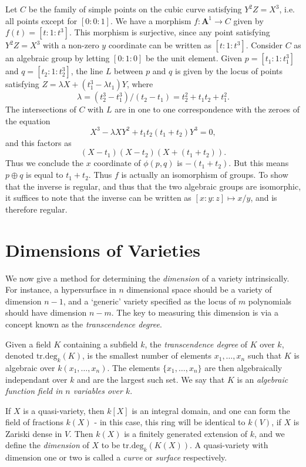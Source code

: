 \begin{example}
    Let $C$ be the family of simple points on the cubic curve satisfying $Y^2Z = X^3$, i.e. all points except for $[0:0:1]$. We have a morphism $f: \mathbf{A}^1 \to C$ given by $f(t) = [t:1:t^3]$. This morphism is surjective, since any point satisfying $Y^2Z = X^3$ with a non-zero $y$ coordinate can be written as $[t:1:t^3]$. Consider $C$ as an algebraic group by letting $[0:1:0]$ be the unit element. Given $p = [t_1:1:t_1^3]$ and $q = [t_2:1:t_2^3]$, the line $L$ between $p$ and $q$ is given by the locus of points satisfying $Z = \lambda X + (t_1^3 - \lambda t_1) Y$, where
    \[ \lambda = (t_2^3 - t_1^3)/(t_2 - t_1) = t_2^2 + t_1t_2 + t_1^2. \]
    The intersections of $C$ with $L$ are in one to one correspondence with the zeroes of the equation
    \[ X^3 - \lambda XY^2 + t_1 t_2 (t_1 + t_2) Y^3 = 0, \]
    and this factors as
    \[ (X - t_1)(X - t_2)(X + (t_1 + t_2)). \]
    Thus we conclude the $x$ coordinate of $\phi(p,q)$ is $-(t_1 + t_2)$. But this means $p \oplus q$ is equal to $t_1 + t_2$. Thus $f$ is actually an isomorphism of groups. To show that the inverse is regular, and thus that the two algebraic groups are isomorphic, it suffices to note that the inverse can be written as $[x:y:z] \mapsto x/y$, and is therefore regular.
\end{example}

\section{Dimensions of Varieties}

We now give a method for determining the \emph{dimension} of a variety intrinsically. For instance, a hypersurface in $n$ dimensional space should be a variety of dimension $n-1$, and a `generic' variety specified as the locus of $m$ polynomials should have dimension $n-m$. The key to measuring this dimension is via a concept known as the \emph{transcendence degree}.

Given a field $K$ containing a subfield $k$, the \emph{transcendence degree} of $K$ over $k$, denoted $\text{tr.deg}_k(K)$, is the smallest number of elements $x_1,\dots,x_n$ such that $K$ is algebraic over $k(x_1,\dots,x_n)$. The elements $\{ x_1, \dots, x_n \}$ are then algebraically independant over $k$ and are the largest such set. We say that $K$ is an \emph{algebraic function field in $n$ variables over $k$}.

If $X$ is a quasi-variety, then $k[X]$ is an integral domain, and one can form the field of fractions $k(X)$ - in this case, this ring will be identical to $k(V)$, if $X$ is Zariski dense in $V$. Then $k(X)$ is a finitely generated extension of $k$, and we define the \emph{dimension} of $X$ to be $\text{tr.deg}_k(K(X))$. A quasi-variety with dimension one or two is called a \emph{curve} or \emph{surface} respectively.

